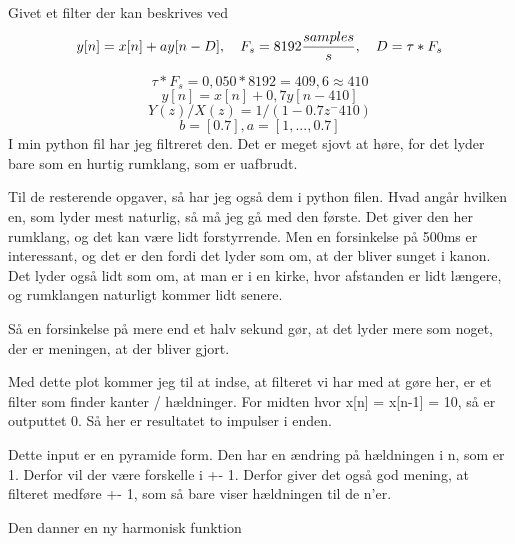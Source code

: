 \begin{Opgaver}
\begin{kapitel}
        \begin{Opgave}
            Givet et filter der kan beskrives ved 
            \[y[n] = x[n] + ay[n - D], \quad F_s = 8192 \frac{samples}{s}, \quad D = \tau * F_s\]
            \begin{UnderOpgave}[For $\tau = 50ms,\tab a = 0,7$ beskriv filteret og brug den til at processere handel lydfilen.]
                \[\tau*F_s = 0,050*8192 = 409,6 \approx 410\] 
                \[y[n] = x[n] + 0,7y[n - 410]\]
                \[Y(z)/X(z) = 1/(1 - 0.7z^-410)\]
                \[b = [0.7], a = [1, ..., 0.7]\]
                I min python fil har jeg filtreret den. Det er meget sjovt at høre, for det lyder bare som en hurtig rumklang, som er uafbrudt.
            \end{UnderOpgave}
            Til de resterende opgaver, så har jeg også dem i python filen. Hvad angår hvilken en, som lyder mest naturlig, så må jeg gå med den første.
            Det giver den her rumklang, og det kan være lidt forstyrrende. 
            Men en forsinkelse på 500ms er interessant, og det er den fordi det lyder som om, at der bliver sunget i kanon.
            Det lyder også lidt som om, at man er i en kirke, hvor afstanden er lidt længere, og rumklangen naturligt kommer lidt senere.

            Så en forsinkelse på mere end et halv sekund gør, at det lyder mere som noget, der er meningen, at der bliver gjort.            
        \end{Opgave}

        \begin{Opgave}
            \begin{UnderOpgave}[\text{$x[n] = 10*(u[n+10] - u[n-20])$}]
                Med dette plot kommer jeg til at indse, at filteret vi har med at gøre her, 
                er et filter som finder kanter / hældninger. For midten hvor x[n] = x[n-1] = 10, så er outputtet 0.
                Så her er resultatet to impulser i enden.
            \end{UnderOpgave}
            \begin{UnderOpgave}[\text{$n(u[n] - u[n-10]) + (20 - n) * (u[n-10] - u[n-20])$}]
                Dette input er en pyramide form. Den har en ændring på hældningen i n, som er 1. Derfor vil der være forskelle i +- 1. 
                Derfor giver det også god mening, at filteret medføre +- 1, som så bare viser hældningen til de n'er. 
            \end{UnderOpgave}
            \begin{UnderOpgave}
                Den danner en ny harmonisk funktion
            \end{UnderOpgave}
        \end{Opgave}


\end{kapitel}
\end{Opgaver}
